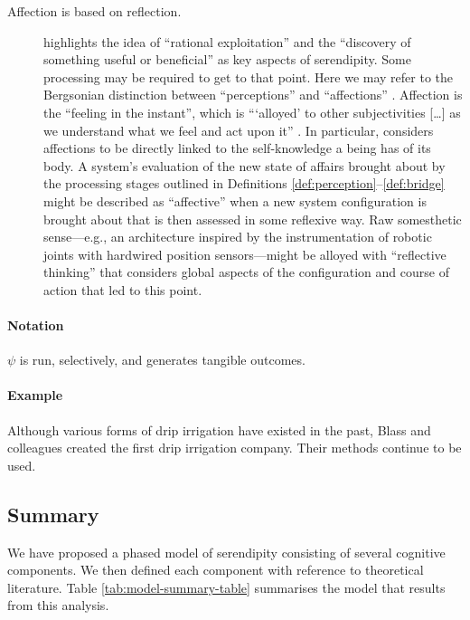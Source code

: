 \begin{description}                      
\item[Affection is based on reflection.]
\citet{campbell2005serendipity} highlights the idea of ``rational
exploitation'' and the ``discovery of something useful or
beneficial'' as key aspects of serendipity.
Some processing may be required
to get to that point. Here we may refer to the Bergsonian
distinction
between ``perceptions'' and ``affections''
\cite[p.~23]{deleuze1991bergsonism}.
Affection is the ``feeling in the instant'', which is {``}`alloyed'
to other subjectivities [\ldots] as we understand what we feel and
act upon it'' \cite[p.~141]{sutton2008deleuze}.
In particular,
\citet[p.~17]{bergson1991matter} considers affections to be directly
linked to the self-knowledge a being has of its body.  A system's
evaluation of the new state of affairs brought about by the processing
stages outlined in Definitions \ref{def:perception}--\ref{def:bridge}
might be described as ``affective''
when a new system configuration is brought about that is then assessed
in some reflexive way.  Raw somesthetic sense---e.g., an architecture inspired by
the instrumentation of robotic joints with hardwired position
sensors---might be alloyed with ``reflective thinking'' \cite{singh2005architecture}
that considers global aspects of the configuration and course of action
that led to this point.
\end{description}                        

\paragraph{\textbf{\upshape Notation}}

$\psi$ is run, selectively, and generates tangible outcomes.

\paragraph{\textbf{\upshape Example}}
Although various forms of drip irrigation have existed in the past,
Blass and colleagues created the first drip irrigation company.  Their
methods continue to be used.

\subsection{Summary}
We have proposed a phased model of serendipity consisting of several
cognitive components.  We then defined each component with reference
to theoretical literature.  Table \ref{tab:model-summary-table}
summarises the model that results from this analysis.


